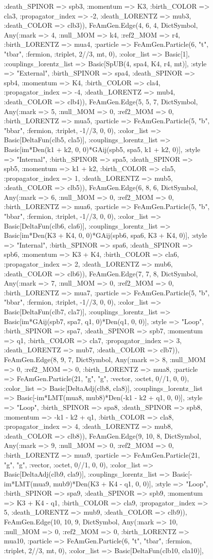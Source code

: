 \documentclass{revtex4}
\begin{document}
\begin{figure}[!htb]
\begin{center}
{:death_SPINOR => spb3, :momentum => K3, :birth_COLOR => cla3, :propagator_index => -2, :death_LORENTZ => mub3, :death_COLOR => clb3)), FeAmGen.Edge(4, 6, 4, Dict{Symbol, Any}(:mark => 4, :null_MOM => k4, :ref2_MOM => r4, :birth_LORENTZ => mua4, :particle => FeAmGen.Particle(6, "t", "tbar", :fermion, :triplet, 2//3, mt, 0), :color_list => Basic[1], :couplings_lorentz_list => Basic[SpUB(4, spa4, K4, r4, mt)], :style => "External", :birth_SPINOR => spa4, :death_SPINOR => spb4, :momentum => K4, :birth_COLOR => cla4, :propagator_index => -4, :death_LORENTZ => mub4, :death_COLOR => clb4)), FeAmGen.Edge(5, 5, 7, Dict{Symbol, Any}(:mark => 5, :null_MOM => 0, :ref2_MOM => 0, :birth_LORENTZ => mua5, :particle => FeAmGen.Particle(5, "b", "bbar", :fermion, :triplet, -1//3, 0, 0), :color_list => Basic[DeltaFun(clb5, cla5)], :couplings_lorentz_list => Basic[im*Den(k1 + k2, 0, 0)*GAij(spb5, spa5, k1 + k2, 0)], :style => "Internal", :birth_SPINOR => spa5, :death_SPINOR => spb5, :momentum => k1 + k2, :birth_COLOR => cla5, :propagator_index => 1, :death_LORENTZ => mub5, :death_COLOR => clb5)), FeAmGen.Edge(6, 8, 6, Dict{Symbol, Any}(:mark => 6, :null_MOM => 0, :ref2_MOM => 0, :birth_LORENTZ => mua6, :particle => FeAmGen.Particle(5, "b", "bbar", :fermion, :triplet, -1//3, 0, 0), :color_list => Basic[DeltaFun(clb6, cla6)], :couplings_lorentz_list => Basic[im*Den(K3 + K4, 0, 0)*GAij(spb6, spa6, K3 + K4, 0)], :style => "Internal", :birth_SPINOR => spa6, :death_SPINOR => spb6, :momentum => K3 + K4, :birth_COLOR => cla6, :propagator_index => 2, :death_LORENTZ => mub6, :death_COLOR => clb6)), FeAmGen.Edge(7, 7, 8, Dict{Symbol, Any}(:mark => 7, :null_MOM => 0, :ref2_MOM => 0, :birth_LORENTZ => mua7, :particle => FeAmGen.Particle(5, "b", "bbar", :fermion, :triplet, -1//3, 0, 0), :color_list => Basic[DeltaFun(clb7, cla7)], :couplings_lorentz_list => Basic[im*GAij(spb7, spa7, q1, 0)*Den(q1, 0, 0)], :style => "Loop", :birth_SPINOR => spa7, :death_SPINOR => spb7, :momentum => q1, :birth_COLOR => cla7, :propagator_index => 3, :death_LORENTZ => mub7, :death_COLOR => clb7)), FeAmGen.Edge(8, 9, 7, Dict{Symbol, Any}(:mark => 8, :null_MOM => 0, :ref2_MOM => 0, :birth_LORENTZ => mua8, :particle => FeAmGen.Particle(21, "g", "g", :vector, :octet, 0//1, 0, 0), :color_list => Basic[DeltaAdj(clb8, cla8)], :couplings_lorentz_list => Basic[-im*LMT(mua8, mub8)*Den(-k1 - k2 + q1, 0, 0)], :style => "Loop", :birth_SPINOR => spa8, :death_SPINOR => spb8, :momentum => -k1 - k2 + q1, :birth_COLOR => cla8, :propagator_index => 4, :death_LORENTZ => mub8, :death_COLOR => clb8)), FeAmGen.Edge(9, 10, 8, Dict{Symbol, Any}(:mark => 9, :null_MOM => 0, :ref2_MOM => 0, :birth_LORENTZ => mua9, :particle => FeAmGen.Particle(21, "g", "g", :vector, :octet, 0//1, 0, 0), :color_list => Basic[DeltaAdj(clb9, cla9)], :couplings_lorentz_list => Basic[-im*LMT(mua9, mub9)*Den(K3 + K4 - q1, 0, 0)], :style => "Loop", :birth_SPINOR => spa9, :death_SPINOR => spb9, :momentum => K3 + K4 - q1, :birth_COLOR => cla9, :propagator_index => 5, :death_LORENTZ => mub9, :death_COLOR => clb9)), FeAmGen.Edge(10, 10, 9, Dict{Symbol, Any}(:mark => 10, :null_MOM => 0, :ref2_MOM => 0, :birth_LORENTZ => mua10, :particle => FeAmGen.Particle(6, "t", "tbar", :fermion, :triplet, 2//3, mt, 0), :color_list => Basic[DeltaFun(clb10, cla10)], }
\end{center}
\end{figure}
\end{document}
